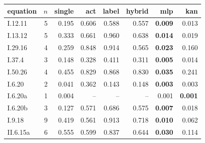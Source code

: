 \begin{tabular}{@{}lrrrrrrr@{}}\toprule
equation & $n$ & single & act & label & hybrid & mlp & kan\\\midrule
I.12.11 & 5 & 0.195 & 0.606 & 0.588 & 0.557 & \textbf{0.009} & 0.013\\
I.13.12 & 5 & 0.333 & 0.661 & 0.960 & 0.638 & \textbf{0.014} & 0.019\\
I.29.16 & 4 & 0.259 & 0.848 & 0.914 & 0.565 & \textbf{0.023} & 0.160\\
I.37.4 & 3 & 0.148 & 0.328 & 0.411 & 0.311 & \textbf{0.005} & 0.014\\
I.50.26 & 4 & 0.455 & 0.829 & 0.868 & 0.830 & \textbf{0.035} & 0.241\\
I.6.20 & 2 & 0.041 & 0.362 & 0.143 & 0.148 & \textbf{0.003} & 0.003\\
I.6.20a & 1 & 0.004 & -- & -- & -- & 0.001 & \textbf{0.001}\\
I.6.20b & 3 & 0.127 & 0.571 & 0.686 & 0.575 & \textbf{0.007} & 0.018\\
I.9.18 & 9 & 0.419 & 0.561 & 0.913 & 0.718 & \textbf{0.010} & 0.062\\
II.6.15a & 6 & 0.555 & 0.599 & 0.837 & 0.644 & \textbf{0.030} & 0.114\\
\bottomrule\end{tabular}